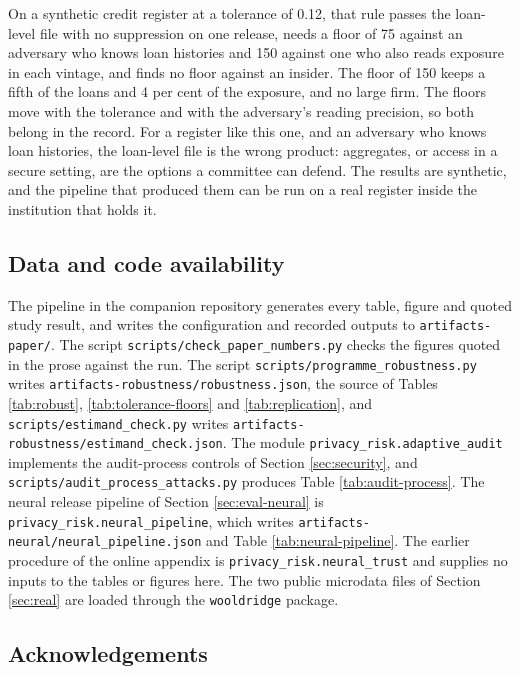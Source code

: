 \documentclass[11pt,a4paper]{article}
\theoremstyle{plain}
\theoremstyle{definition}
\theoremstyle{definition}
\theoremstyle{plain}
\begin{document}
On a synthetic credit register at a tolerance of 0.12, that rule passes the
loan-level file with no suppression on one release, needs a floor of 75 against
an adversary who knows loan histories and 150 against one who also reads
exposure in each vintage, and finds no floor against an insider. The floor of
150 keeps a fifth of the loans and 4 per cent of the exposure, and no large firm.
The floors move with the tolerance and with the adversary's reading precision,
so both belong in the record. For a register like this one, and an adversary who
knows loan histories, the loan-level file is the wrong product: aggregates, or
access in a secure setting, are the options a committee can defend. The results
are synthetic, and the pipeline that produced them can be run on a real register
inside the institution that holds it.

\subsection*{Data and code availability}

The pipeline in the companion repository generates every table, figure and quoted
study result, and writes the configuration and recorded outputs to
\nolinkurl{artifacts-paper/}. The script \nolinkurl{scripts/check_paper_numbers.py}
checks the figures quoted in the prose against the run. The script
\nolinkurl{scripts/programme_robustness.py} writes
\nolinkurl{artifacts-robustness/robustness.json}, the source of Tables
\ref{tab:robust}, \ref{tab:tolerance-floors} and \ref{tab:replication}, and
\nolinkurl{scripts/estimand_check.py} writes
\nolinkurl{artifacts-robustness/estimand_check.json}. The module
\texttt{privacy\_risk.adaptive\_audit} implements the audit-process controls of
Section \ref{sec:security}, and \nolinkurl{scripts/audit_process_attacks.py}
produces Table \ref{tab:audit-process}. The neural release pipeline of Section
\ref{sec:eval-neural} is \texttt{privacy\_risk.neural\_pipeline}, which writes
\nolinkurl{artifacts-neural/neural_pipeline.json} and Table
\ref{tab:neural-pipeline}. The earlier procedure of the online appendix is
\texttt{privacy\_risk.neural\_trust} and supplies no inputs to the tables or
figures here. The two public microdata files
of Section \ref{sec:real} are loaded through the \texttt{wooldridge} package.

\subsection*{Acknowledgements}
\end{document}
